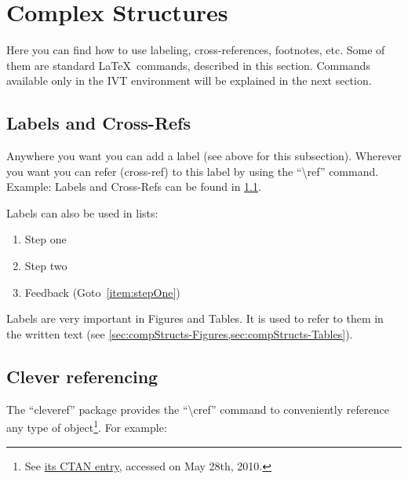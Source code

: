\documentclass[numbered]{ivt-style/standard}\usepackage[]{graphicx}\usepackage[]{xcolor}
\begin{document}
\section{Complex Structures}
%

Here you can find how to use labeling, cross-references, footnotes,
etc. Some of them are standard \LaTeX\ commands,
described in this section.
Commands available only in the IVT environment
will be explained in the next section.

\subsection{Labels and Cross-Refs}
\label{sec:compStructs-LabelsCrossRefs}

Anywhere you want you can add a label (see above for this subsection).
Wherever you want you can refer (cross-ref) to this label by using the
``\textbackslash{}ref'' command.
Example:
Labels and Cross-Refs can be found in
\cref{sec:compStructs-LabelsCrossRefs}.

Labels can also be used in lists:

\begin{enumerate}
  \item\label{item:stepOne} Step one
  \item Step two
  \item Feedback (Goto~\ref{item:stepOne})
\end{enumerate}

Labels are very important in Figures and Tables. It is used to refer
to them
in the written text (see \cref{sec:compStructs-Figures,sec:compStructs-Tables}).

\subsection{Clever referencing}\label{sec:CleverReferencing}

The ``cleveref'' package provides the ``\textbackslash{}cref'' command to conveniently
reference any type of object\footnote{See
\href{http://www.ctan.org/tex-archive/help/Catalogue/entries/cleveref.html}{its CTAN entry},
accessed on May 28th, 2010.}. For example:
\end{document}
